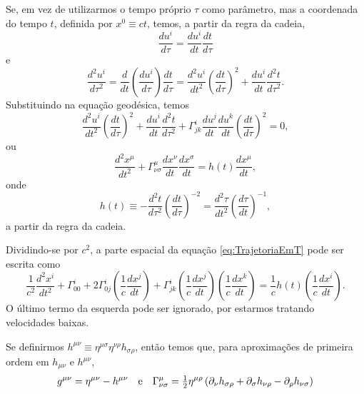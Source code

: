 Se, em vez de utilizarmos o tempo próprio $ \tau $ como parâmetro, mas a coordenada do tempo $ t $, definida por $ x^0 \equiv ct $, temos, a partir da regra da cadeia,
\[
\frac{du^i}{d\tau}=\frac{du^i}{dt}\frac{dt}{d\tau}
\]
e
\[
	\frac{d^2u^i}{d\tau^2}=\frac{d}{dt}\left( \frac{du^i}{d\tau} \right)\frac{dt}{d\tau} = \frac{d^2u^i}{dt^2}\left( \frac{dt}{d\tau} \right)^2 + \frac{du^i}{dt}\frac{d^2t}{d\tau^2}.
\]
Substituindo na equação geodésica, temos
\[
	\frac{d^2u^i}{dt^2}\left( \frac{dt}{d\tau} \right)^2 + \frac{du^i}{dt}\frac{d^2t}{d\tau^2} + \Gamma^i_{jk} \frac{du^j}{dt}\frac{du^k}{dt}\left( \frac{dt}{d\tau} \right)^2 = 0 ,
\]
ou
\begin{equation}\label{eq:TrajetoriaEmT}
\frac{d^{2} x^{\mu}}{d t^{2}}+\Gamma_{\nu \sigma}^{\mu} \frac{d x^{\nu}}{d t} \frac{d x^{\sigma}}{d t}=h(t) \frac{d x^{\mu}}{d t} ,
\end{equation}
onde
\begin{equation}\label{eq:HDefinicao}
h(t) \equiv-\frac{d^{2} t}{d \tau^{2}}\left(\frac{d t}{d \tau}\right)^{-2}=\frac{d^{2} \tau}{d t^{2}}\left(\frac{d \tau}{d t}\right)^{-1},
\end{equation}
a partir da regra da cadeia.


Dividindo-se por $ c^2 $, a parte espacial da equação \eqref{eq:TrajetoriaEmT} pode ser escrita como
\begin{equation}\label{eq:TrajetoriaParteEspacial}
\frac{1}{c^{2}} \frac{d^{2} x^{i}}{d t^{2}}+\Gamma_{00}^{i}+2 \Gamma_{0 j}^{i}\left(\frac{1}{c} \frac{d x^{j}}{d t}\right)+\Gamma_{j k}^{i}\left(\frac{1}{c} \frac{d x^{j}}{d t}\right)\left(\frac{1}{c} \frac{d x^{k}}{d t}\right)=\frac{1}{c} h(t)\left(\frac{1}{c} \frac{d x^{i}}{d t}\right).
\end{equation}
O último termo da esquerda pode ser ignorado, por estarmos tratando velocidades baixas.

Se definirmos $ h^{\mu \nu} \equiv \eta^{\mu \sigma} \eta^{\nu \rho} h_{\sigma \rho} $, então temos que, para aproximações de primeira ordem em $ h_{\mu \nu} \text { e } h^{\mu \nu} $,
\begin{equation}\label{eq:HCovariante}
g^{\mu \nu}=\eta^{\mu \nu}-h^{\mu \nu} \qq{e} \Gamma_{\nu \sigma}^{\mu}=\tfrac{1}{2} \eta^{\mu \rho}\left(\partial_{\nu} h_{\sigma \rho}+\partial_{\sigma} h_{\nu \rho}-\partial_{\rho} h_{\nu \sigma}\right)
\end{equation}

